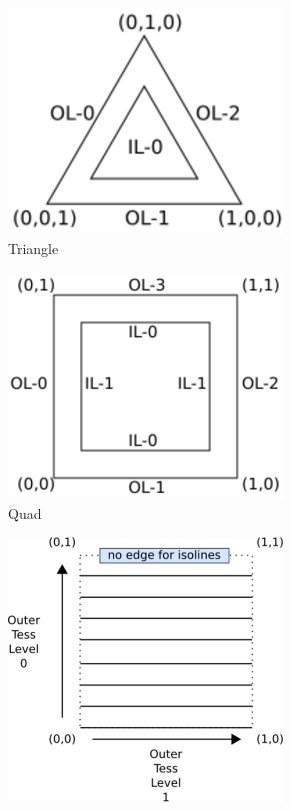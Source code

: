 \documentclass[a4paper]{article}
\begin{document}
\begin{figure}[h]
  \centering

  \begin{subfigure}[b]{0.3\textwidth}
    \includegraphics[width=0.8\textwidth]{graphics/tess_triangle.eps}
    \caption{Triangle}
  \end{subfigure}
  \begin{subfigure}[b]{0.3\textwidth}
    \includegraphics[width=0.8\textwidth]{graphics/tess_quad.eps}
    \caption{Quad}
  \end{subfigure}
  \begin{subfigure}[b]{0.3\textwidth}
    \includegraphics[width=0.8\textwidth]{graphics/tess_isoline.eps}

\end{subfigure}
\end{figure}
\end{document}

